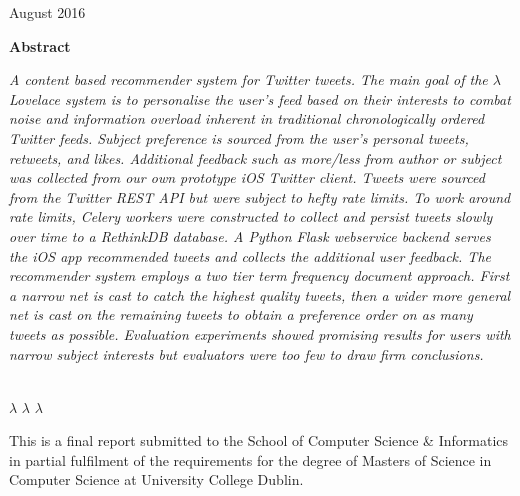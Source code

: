 \documentclass{article}
\begin{document}
\vspace{2.5em}

\begin{center}
     August 2016
\end{center}


\newpage



\begin{center}
    {\Large \textbf{Abstract}} \\
    \vspace{2em}
    \parbox{0.85\textwidth}
    {\textsl{
        A content based recommender system for Twitter tweets. The main goal of the $\lambda$ Lovelace system is to personalise the user's feed based on their interests to combat noise and information overload inherent in traditional chronologically ordered Twitter feeds. Subject preference is sourced from the user’s personal tweets, retweets, and likes. Additional feedback such as \textit{more/less} from \textit{author} or \textit{subject} was collected from our own prototype iOS Twitter client. Tweets were sourced from the Twitter REST API but were subject to hefty rate limits. To work around rate limits, Celery workers were constructed to collect and persist tweets slowly over time to a RethinkDB database. A Python Flask webservice backend serves the iOS app recommended tweets and collects the additional user feedback. The recommender system employs a two tier term frequency document approach. First a narrow net is cast to catch the highest quality tweets, then a wider more general net is cast on the remaining tweets to obtain a preference order on as many tweets as possible. Evaluation experiments showed promising results for users with narrow subject interests but evaluators were too few to draw firm conclusions.
    }} \\
    \vspace{2em}
    {\scriptsize $\lambda$ $\lambda$ $\lambda$}
\end{center}

\noindent This is a final report submitted to the School of Computer Science \& Informatics in partial fulfilment of the requirements for the degree of Masters of Science in Computer Science at University College Dublin.
\end{document}
